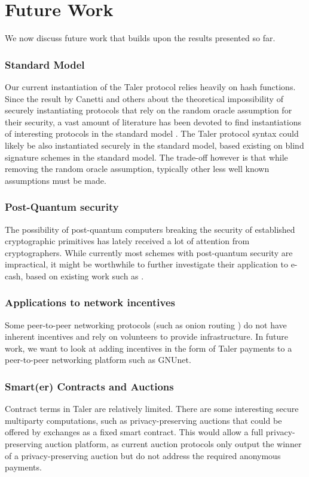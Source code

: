 \chapter{Future Work}\label{chapter:future-work}
We now discuss future work that builds upon the results presented so far.


\subsection*{Standard Model}
Our current instantiation of the Taler protocol relies heavily on hash
functions.  Since the result by Canetti and others \cite{canetti2004random}
about the theoretical impossibility of securely instantiating protocols that
rely on the random oracle assumption for their security, a vast amount of
literature has been devoted to find instantiations of interesting protocols in
the standard model \cite{koblitz2015random}.  The Taler protocol syntax could
likely be also instantiated securely in the standard model, based existing on
blind signature schemes in the standard model.  The trade-off however is that
while removing the random oracle assumption, typically other less well known
assumptions must be made.

\subsection*{Post-Quantum security}
The possibility of post-quantum computers breaking the security of established
cryptographic primitives has lately received a lot of attention from
cryptographers.  While currently most schemes with post-quantum security are impractical,
it might be worthwhile to further investigate their application to e-cash, based
on existing work such as \cite{zhang2018new}.

\subsection*{Applications to network incentives}
Some peer-to-peer networking protocols (such as onion routing
\cite{dingledine2004tor}) do not have inherent incentives and rely on
volunteers to provide infrastructure.  In future work, we want to look at
adding incentives in the form of Taler payments to a peer-to-peer networking
platform such as GNUnet.

\subsection*{Smart(er) Contracts and Auctions}
Contract terms in Taler are relatively limited.  There are some interesting
secure multiparty computations, such as privacy-preserving auctions
\cite{brandt2006obtain} that could be offered by exchanges as a fixed smart
contract.  This would allow a full privacy-preserving auction platform, as
current auction protocols only output the winner of a privacy-preserving
auction but do not address the required anonymous payments.


